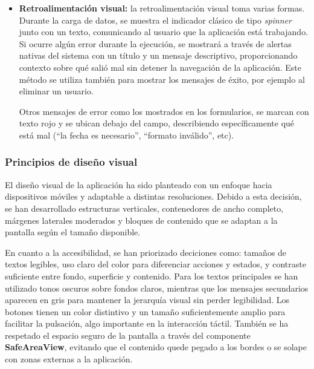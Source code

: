 \begin{itemize}
    Cuando se navega hacia una pantalla que tiene un listado, se hace una petición al servidor y se obtienen todos los datos que van a ser mostrados en la tarjeta. En caso de que el usuario navega a otra pantalla y luego vuelva a la misma, la información se recarga
    automáticamente gracias al uso del \textit{hook} \textbf{useEffect}, que realiza la petición de nuevo al backend para obtener la información antes de renderizar el componente. Esto asegura que siempre se van a ver los datos actualizados sin obligar al usuario 
    a pulsar un botón de ``refrescar''.

    \item \textbf{Retroalimentación visual:} la retroalimentación visual toma varias formas. Durante la carga de datos, se muestra el indicador clásico de tipo \textit{spinner} junto con un texto, comunicando al usuario que la aplicación está trabajando. Si ocurre 
    algún error durante la ejecución, se mostrará a través de alertas nativas del sistema con un título y un mensaje descriptivo, proporcionando contexto sobre qué salió mal sin detener la navegación de la aplicación. Este método se utiliza también para mostrar los
    mensajes de éxito, por ejemplo al eliminar un usuario.

    Otros mensajes de error como los mostrados en los formularios, se marcan con texto rojo y se ubican debajo del campo, describiendo específicamente qué está mal (``la fecha es necesario'', ``formato inválido'', etc).
\end{itemize}

\subsubsection{Principios de diseño visual}

El diseño visual de la aplicación ha sido planteado con un enfoque hacia dispositivos móviles y adaptable a distintas resoluciones. Debido a esta decisión, se han desarrollado estructuras verticales, contenedores de ancho completo, márgenes laterales moderados y 
bloques de contenido que se adaptan a la pantalla según el tamaño disponible.

En cuanto a la accesibilidad, se han priorizado deciciones como: tamaños de textos legibles, uso claro del color para diferenciar acciones y estados, y contraste suficiente entre fondo, superficie y contenido. Para los textos principales se han utilizado tonos 
oscuros sobre fondos claros, mientras que los mensajes secundarios aparecen en gris para mantener la jerarquía visual sin perder legibilidad. Los botones tienen un color distintivo y un tamaño suficientemente amplio para facilitar la pulsación, algo importante en
la interacción táctil. También se ha respetado el espacio seguro de la pantalla a través del componente \textbf{SafeAreaView}, evitando que el contenido quede pegado a los bordes o se solape con zonas externas a la aplicación.

